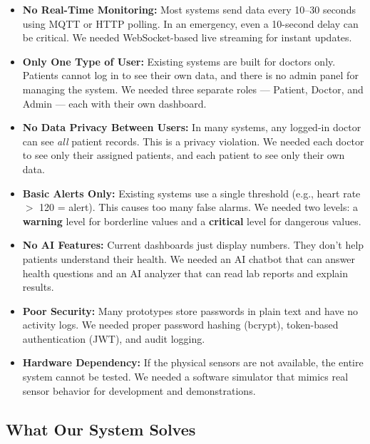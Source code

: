 \documentclass[12pt,a4paper]{article}
\begin{document}
\begin{itemize}[leftmargin=*]
    \item \textbf{No Real-Time Monitoring:} Most systems send data every 10--30 seconds using MQTT or HTTP polling. In an emergency, even a 10-second delay can be critical. We needed WebSocket-based live streaming for instant updates.

    \item \textbf{Only One Type of User:} Existing systems are built for doctors only. Patients cannot log in to see their own data, and there is no admin panel for managing the system. We needed three separate roles --- Patient, Doctor, and Admin --- each with their own dashboard.

    \item \textbf{No Data Privacy Between Users:} In many systems, any logged-in doctor can see \textit{all} patient records. This is a privacy violation. We needed each doctor to see only their assigned patients, and each patient to see only their own data.

    \item \textbf{Basic Alerts Only:} Existing systems use a single threshold (e.g., heart rate $>$ 120 = alert). This causes too many false alarms. We needed two levels: a \textbf{warning} level for borderline values and a \textbf{critical} level for dangerous values.

    \item \textbf{No AI Features:} Current dashboards just display numbers. They don't help patients understand their health. We needed an AI chatbot that can answer health questions and an AI analyzer that can read lab reports and explain results.

    \item \textbf{Poor Security:} Many prototypes store passwords in plain text and have no activity logs. We needed proper password hashing (bcrypt), token-based authentication (JWT), and audit logging.

    \item \textbf{Hardware Dependency:} If the physical sensors are not available, the entire system cannot be tested. We needed a software simulator that mimics real sensor behavior for development and demonstrations.
\end{itemize}

\subsection{What Our System Solves}
\end{document}
